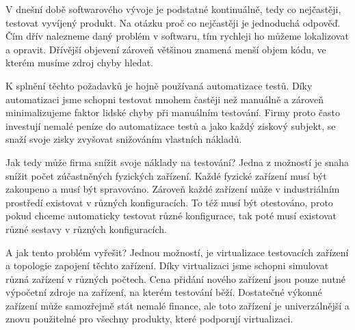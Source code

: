 \begin{introduction}
V dnešní době softwarového vývoje je podstatné kontinuálně, tedy co nejčastěji, testovat vyvíjený produkt. Na otázku proč co nejčastěji je jednoduchá odpověď. Čím dřív nalezneme daný problém v softwaru, tím rychleji ho můžeme lokalizovat a opravit. Dřívější objevení zároveň většinou znamená menší objem kódu, ve kterém musíme zdroj chyby hledat.

K splnění těchto požadavků je hojně používaná automatizace testů. Díky automatizaci jsme schopni testovat mnohem častěji než manuálně a zároveň minimalizujeme faktor lidské chyby při manuálním testování. Firmy proto často investují nemalé peníze do automatizace testů a jako každý ziskový subjekt, se snaží svoje zisky zvyšovat snižováním vlastních nákladů. 

Jak tedy může firma snížit svoje náklady na testování? Jedna z možností je snaha snížit počet zúčastněných fyzických zařízení. Každé fyzické zařízení musí být zakoupeno a musí být spravováno. Zároveň každé zařízení může v industriálním prostředí existovat v různých konfiguracích. To též musí být otestováno, proto pokud chceme automaticky testovat různé konfigurace, tak poté musí existovat různé sestavy v různých konfiguracích. 

A jak tento problém vyřešit? Jednou možností, je virtualizace testovacích zařízení a topologie zapojení těchto zařízení. Díky virtualizaci jsme schopni simulovat různá zařízení v různých počtech. Cena přidání nového zařízení jsou pouze nutné výpočetní zdroje na zařízení, na kterém testování běží. Dostatečné výkonné zařízení může samozřejmě stát nemalé finance, ale toto zařízení je univerzálnější a znovu použitelné pro všechny produkty, které podporují virtualizaci.

\end{introduction}